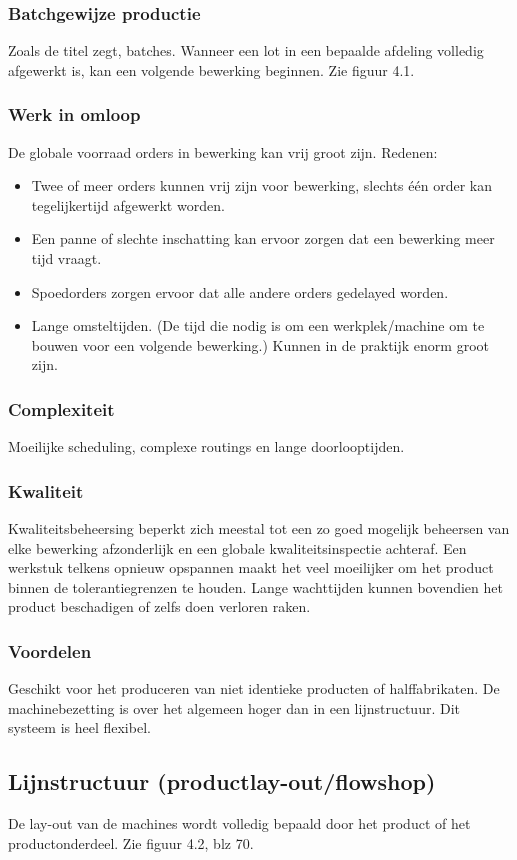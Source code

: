 \documentclass[12pt]{article}
\begin{document}
\subsubsection{Batchgewijze productie}
Zoals de titel zegt, batches. Wanneer een lot in een bepaalde afdeling volledig afgewerkt is, kan een volgende bewerking beginnen. Zie figuur 4.1.
\subsubsection{Werk in omloop}
De globale voorraad orders in bewerking kan vrij groot zijn. Redenen:
\begin{itemize}
\item Twee of meer orders kunnen vrij zijn voor bewerking, slechts \'e\'en order kan tegelijkertijd afgewerkt worden.
\item Een panne of slechte inschatting kan ervoor zorgen dat een bewerking meer tijd vraagt.
\item Spoedorders zorgen ervoor dat alle andere orders gedelayed worden.
\item Lange omsteltijden. (De tijd die nodig is om een werkplek/machine om te bouwen voor een volgende bewerking.) Kunnen in de praktijk enorm groot zijn.
\end{itemize}
\subsubsection{Complexiteit}
Moeilijke scheduling, complexe routings en lange doorlooptijden.
\subsubsection{Kwaliteit}
Kwaliteitsbeheersing beperkt zich meestal tot een zo goed mogelijk beheersen van elke bewerking afzonderlijk en een globale kwaliteitsinspectie achteraf. Een werkstuk telkens opnieuw opspannen maakt het veel moeilijker om het product binnen de tolerantiegrenzen te houden. Lange wachttijden kunnen bovendien het product beschadigen of zelfs doen verloren raken.
\subsubsection{Voordelen}
Geschikt voor het produceren van niet identieke producten of halffabrikaten. De machinebezetting is over het algemeen hoger dan in een lijnstructuur. Dit systeem is heel flexibel.
\subsection{Lijnstructuur (productlay-out/flowshop)}
De lay-out van de machines wordt volledig bepaald door het product of het productonderdeel. Zie figuur 4.2, blz 70.
\end{document}
